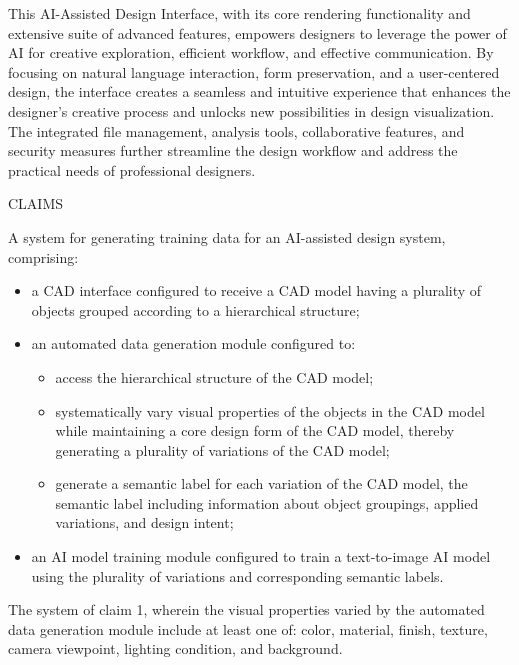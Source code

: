 \documentclass[12pt]{report}
\begin{document}
This AI-Assisted Design Interface, with its core rendering functionality and extensive suite of advanced features, empowers designers to leverage the power of AI for creative exploration, efficient workflow, and effective communication. By focusing on natural language interaction, form preservation, and a user-centered design, the interface creates a seamless and intuitive experience that enhances the designer's creative process and unlocks new possibilities in design visualization. The integrated file management, analysis tools, collaborative features, and security measures further streamline the design workflow and address the practical needs of professional designers.

\begin{center}
CLAIMS
\end{center}

A system for generating training data for an AI-assisted design system, comprising:

\begin{itemize}
    \item a CAD interface configured to receive a CAD model having a plurality of objects grouped according to a hierarchical structure;
    
    \item an automated data generation module configured to:
    \begin{itemize}
        \item access the hierarchical structure of the CAD model;
        \item systematically vary visual properties of the objects in the CAD model while maintaining a core design form of the CAD model, thereby generating a plurality of variations of the CAD model;
        \item generate a semantic label for each variation of the CAD model, the semantic label including information about object groupings, applied variations, and design intent;
    \end{itemize}
    
    \item an AI model training module configured to train a text-to-image AI model using the plurality of variations and corresponding semantic labels.
\end{itemize}

The system of claim 1, wherein the visual properties varied by the automated data generation module include at least one of: color, material, finish, texture, camera viewpoint, lighting condition, and background.
\end{document}
